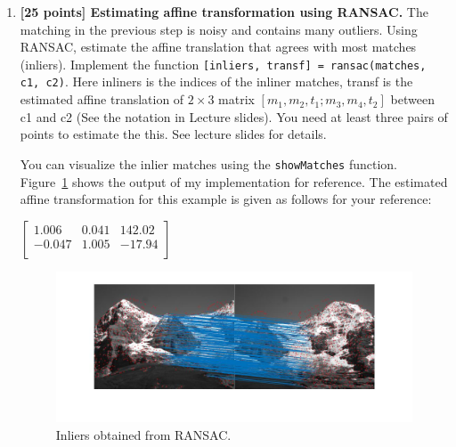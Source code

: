 \documentclass[10pt,letterpaper]{article}
\newcommand{\cmd}[1] {{\color{blue}\texttt{#1}}}
\begin{document}
\begin{enumerate}
\item \textbf{[25 points] Estimating affine transformation using RANSAC.} The matching in the previous step is noisy and contains many outliers. Using RANSAC, estimate the affine translation that agrees with most matches (inliers). Implement the function \cmd{[inliers, transf] = ransac(matches, c1, c2)}. Here inliners is the indices of the inliner matches, transf is the estimated affine translation of $2\times 3$ matrix \cmd{$[m_1, m_2, t_1; m_3, m_4, t_2]$} between c1 and c2 (See the notation in Lecture slides). You need at least three pairs of points to estimate the this. See lecture slides for details.

You can visualize the inlier matches using the \cmd{showMatches} function. Figure~\ref{fig:ransac_result} shows the output of my implementation for reference. The estimated affine transformation for this example is given as follows for your reference:

\begin{center}
$\begin{bmatrix}
1.006 & 0.041 & 142.02 \\
-0.047 & 1.005 & -17.94 \\
\end{bmatrix}$
\end{center}

\begin{figure}[h]
\centering
\includegraphics[width=0.95\linewidth]{./fig/ransac_result.jpg}
\vspace{-0.6in}
\caption{\label{fig:ransac_result} Inliers obtained from RANSAC.}
\end{figure}


\end{enumerate}
\end{document}
